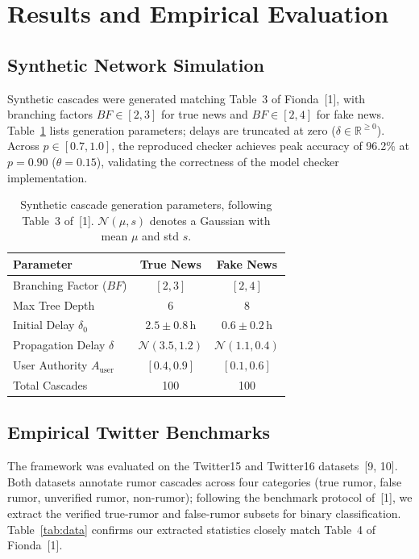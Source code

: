 \documentclass[10pt,twocolumn,a4paper]{article}
\begin{document}
\section{Results and Empirical Evaluation}
\subsection{Synthetic Network Simulation}
Synthetic cascades were generated matching Table~3 of Fionda~[1], with branching factors $BF\in[2,3]$ for true news and $BF\in[2,4]$ for fake news. Table~\ref{tab:synth} lists generation parameters; delays are truncated at zero ($\delta \in \mathbb{R}^{\ge 0}$). Across $p\in[0.7,1.0]$, the reproduced checker achieves peak accuracy of 96.2\% at $p=0.90$ ($\theta=0.15$), validating the correctness of the model checker implementation.
 
\begin{table}[t]
\centering
\caption{Synthetic cascade generation parameters, following Table~3 of~[1]. $\mathcal{N}(\mu, s)$ denotes a Gaussian with mean $\mu$ and std $s$.}
\label{tab:synth}
\footnotesize
\setlength{\tabcolsep}{4pt}
\begin{tabular}{lcc}
\toprule
Parameter & True News & Fake News\\
\midrule
Branching Factor ($BF$) & $[2,3]$ & $[2,4]$\\
Max Tree Depth & 6 & 8\\
Initial Delay $\delta_0$ & $2.5\pm0.8$\,h & $0.6\pm0.2$\,h\\
Propagation Delay $\delta$ & $\mathcal{N}(3.5,1.2)$ & $\mathcal{N}(1.1,0.4)$\\
User Authority $A_{\mathrm{user}}$ & $[0.4,0.9]$ & $[0.1,0.6]$\\
Total Cascades & 100 & 100\\
\bottomrule
\end{tabular}
\end{table}
 
\subsection{Empirical Twitter Benchmarks}
The framework was evaluated on the Twitter15 and Twitter16 datasets~[9, 10]. Both datasets annotate rumor cascades across four categories (true rumor, false rumor, unverified rumor, non-rumor); following the benchmark protocol of~[1], we extract the verified true-rumor and false-rumor subsets for binary classification. Table~\ref{tab:data} confirms our extracted statistics closely match Table~4 of Fionda~[1].
 
\end{document}

